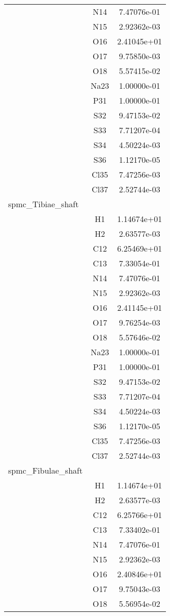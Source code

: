 \begin{centering}
\begin{longtable}{l c c}
& N14 & 7.47076e-01 \\ 
& N15 & 2.92362e-03 \\ 
& O16 & 2.41045e+01 \\ 
& O17 & 9.75850e-03 \\ 
& O18 & 5.57415e-02 \\ 
& Na23 & 1.00000e-01 \\ 
& P31 & 1.00000e-01 \\ 
& S32 & 9.47153e-02 \\ 
& S33 & 7.71207e-04 \\ 
& S34 & 4.50224e-03 \\ 
& S36 & 1.12170e-05 \\ 
& Cl35 & 7.47256e-03 \\ 
& Cl37 & 2.52744e-03 \\ 
\hline
spmc\_Tibiae\_shaft & & \\
\hline
& H1 & 1.14674e+01 \\ 
& H2 & 2.63577e-03 \\ 
& C12 & 6.25469e+01 \\ 
& C13 & 7.33054e-01 \\ 
& N14 & 7.47076e-01 \\ 
& N15 & 2.92362e-03 \\ 
& O16 & 2.41145e+01 \\ 
& O17 & 9.76254e-03 \\ 
& O18 & 5.57646e-02 \\ 
& Na23 & 1.00000e-01 \\ 
& P31 & 1.00000e-01 \\ 
& S32 & 9.47153e-02 \\ 
& S33 & 7.71207e-04 \\ 
& S34 & 4.50224e-03 \\ 
& S36 & 1.12170e-05 \\ 
& Cl35 & 7.47256e-03 \\ 
& Cl37 & 2.52744e-03 \\ 
\hline
spmc\_Fibulae\_shaft & & \\
\hline
& H1 & 1.14674e+01 \\ 
& H2 & 2.63577e-03 \\ 
& C12 & 6.25766e+01 \\ 
& C13 & 7.33402e-01 \\ 
& N14 & 7.47076e-01 \\ 
& N15 & 2.92362e-03 \\ 
& O16 & 2.40846e+01 \\ 
& O17 & 9.75043e-03 \\ 
& O18 & 5.56954e-02 \\ 

\end{longtable}
\end{centering}
